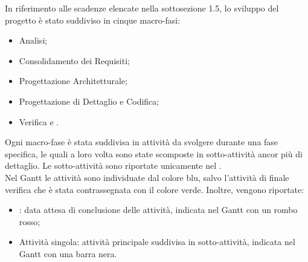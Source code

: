In riferimento alle scadenze elencate nella sottosezione 1.5, lo sviluppo del progetto è stato suddiviso in cinque macro-fasi:
\begin{itemize}
\item{Analisi;}
\item{Consolidamento dei Requisiti;}
\item{Progettazione Architetturale;}
\item{Progettazione di Dettaglio e Codifica;}
\item{Verifica e .}
\end{itemize}

Ogni macro-fase è stata suddivisa in attività da svolgere durante una fase specifica, le quali a loro volta sono state scomposte in sotto-attività ancor più di dettaglio. Le sotto-attività sono riportate unicamente nel . \\ Nel Gantt le attività sono individuate dal colore blu, salvo l'attività di finale verifica che è stata contrassegnata con il colore verde. Inoltre, vengono riportate:
\begin{itemize}
\item{: data attesa di conclusione delle attività, indicata nel Gantt con un rombo rosso;}
\item{Attività singola: attività principale suddivisa in sotto-attività, indicata nel Gantt con una barra nera.}
\end{itemize}
\pagebreak






